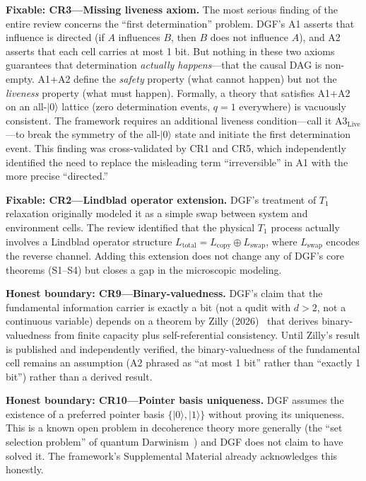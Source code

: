 \documentclass[12pt,a4paper]{article}
\theoremstyle{definition}
\theoremstyle{remark}
\begin{document}
\textbf{Fixable: CR3---Missing liveness axiom.} The most serious finding of the entire review concerns the ``first determination'' problem. DGF's A1 asserts that influence is directed (if $A$ influences $B$, then $B$ does not influence $A$), and A2 asserts that each cell carries at most 1 bit. But nothing in these two axioms guarantees that determination \emph{actually happens}---that the causal DAG is non-empty. A1+A2 define the \emph{safety} property (what cannot happen) but not the \emph{liveness} property (what must happen). Formally, a theory that satisfies A1+A2 on an all-$|0\rangle$ lattice (zero determination events, $q=1$ everywhere) is vacuously consistent. The framework requires an additional liveness condition---call it A3$_{\mathrm{Live}}$---to break the symmetry of the all-$|0\rangle$ state and initiate the first determination event. This finding was cross-validated by CR1 and CR5, which independently identified the need to replace the misleading term ``irreversible'' in A1 with the more precise ``directed.''

\textbf{Fixable: CR2---Lindblad operator extension.} DGF's treatment of $T_1$ relaxation originally modeled it as a simple swap between system and environment cells. The review identified that the physical $T_1$ process actually involves a Lindblad operator structure $L_{\mathrm{total}} = L_{\mathrm{copy}} \oplus L_{\mathrm{swap}}$, where $L_{\mathrm{swap}}$ encodes the reverse channel. Adding this extension does not change any of DGF's core theorems (S1--S4) but closes a gap in the microscopic modeling.

\textbf{Honest boundary: CR9---Binary-valuedness.} DGF's claim that the fundamental information carrier is exactly a bit (not a qudit with $d>2$, not a continuous variable) depends on a theorem by Zilly (2026)~\cite{Zilly2026} that derives binary-valuedness from finite capacity plus self-referential consistency. Until Zilly's result is published and independently verified, the binary-valuedness of the fundamental cell remains an assumption (A2 phrased as ``at most 1 bit'' rather than ``exactly 1 bit'') rather than a derived result.

\textbf{Honest boundary: CR10---Pointer basis uniqueness.} DGF assumes the existence of a preferred pointer basis $\{|0\rangle, |1\rangle\}$ without proving its uniqueness. This is a known open problem in decoherence theory more generally (the ``set selection problem'' of quantum Darwinism~\cite{Zurek2009}) and DGF does not claim to have solved it. The framework's Supplemental Material already acknowledges this honestly.
\end{document}
